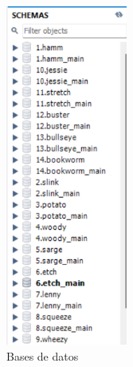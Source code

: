 \documentclass[a4paper, 12pt]{book}
\begin{document}
\begin{figure}
	\centering
	\includegraphics[width=4cm, keepaspectratio]{img/BBDDsql.png}
	\caption{Bases de datos}
	\label{fig:BBDDsql}
\end{figure}
\end{document}
